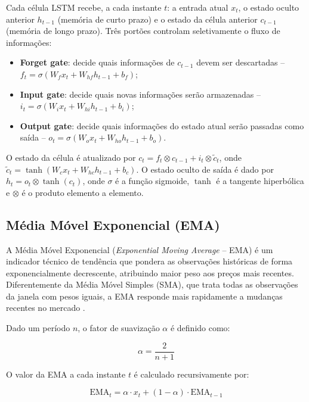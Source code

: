 \documentclass[12pt]{article}
\begin{document}
Cada célula LSTM recebe, a cada instante $t$: a entrada atual $x_t$, o estado
oculto anterior $h_{t-1}$ (memória de curto prazo) e o estado da célula
anterior $c_{t-1}$ (memória de longo prazo). Três portões controlam
seletivamente o fluxo de informações:

\begin{itemize}
  \item \textbf{Forget gate}: decide quais informações de $c_{t-1}$ devem ser
        descartadas -- $f_t = \sigma(W_f x_t + W_{hf} h_{t-1} + b_f)$;
  \item \textbf{Input gate}: decide quais novas informações serão armazenadas
        -- $i_t = \sigma(W_i x_t + W_{hi} h_{t-1} + b_i)$;
  \item \textbf{Output gate}: decide quais informações do estado atual serão
        passadas como saída -- $o_t = \sigma(W_o x_t + W_{ho} h_{t-1} + b_o)$.
\end{itemize}

O estado da célula é atualizado por $c_t = f_t \otimes c_{t-1} + i_t \otimes
\tilde{c}_t$, onde $\tilde{c}_t = \tanh(W_c x_t + W_{hc} h_{t-1} + b_c)$.
O estado oculto de saída é dado por $h_t = o_t \otimes \tanh(c_t)$, onde
$\sigma$ é a função sigmoide, $\tanh$ é a tangente hiperbólica e $\otimes$
é o produto elemento a elemento.

\subsection{Média Móvel Exponencial (EMA)}

A Média Móvel Exponencial (\textit{Exponential Moving Average} -- EMA) é um
indicador técnico de tendência que pondera as observações históricas de forma
exponencialmente decrescente, atribuindo maior peso aos preços mais recentes.
Diferentemente da Média Móvel Simples (SMA), que trata todas as observações
da janela com pesos iguais, a EMA responde mais rapidamente a mudanças
recentes no mercado \cite{zanotto:2026}.

Dado um período $n$, o fator de suavização $\alpha$ é definido como:

\begin{equation}
  \alpha = \frac{2}{n + 1}
\end{equation}

O valor da EMA a cada instante $t$ é calculado recursivamente por:

\begin{equation}
  \text{EMA}_t = \alpha \cdot x_t + (1 - \alpha) \cdot \text{EMA}_{t-1}
\end{equation}
\end{document}
